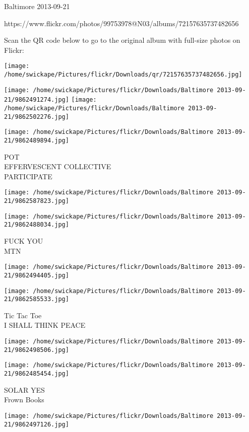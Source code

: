 \documentclass[10pt,letterpaper]{article}
\begin{document}
Baltimore 2013-09-21

https://www.flickr.com/photos/99753978@N03/albums/72157635737482656

Scan the QR code below to go to the original album with full-size photos on Flickr:

\texttt{[image: /home/swickape/Pictures/flickr/Downloads/qr/72157635737482656.jpg]}
\pagebreak

\texttt{[image: /home/swickape/Pictures/flickr/Downloads/Baltimore 2013-09-21/9862491274.jpg]}
\texttt{[image: /home/swickape/Pictures/flickr/Downloads/Baltimore 2013-09-21/9862502276.jpg]}

\texttt{[image: /home/swickape/Pictures/flickr/Downloads/Baltimore 2013-09-21/9862489894.jpg]}

POT\\
EFFERVESCENT COLLECTIVE\\
PARTICIPATE
\pagebreak

\texttt{[image: /home/swickape/Pictures/flickr/Downloads/Baltimore 2013-09-21/9862587823.jpg]}

\vspace{0.25in}
\texttt{[image: /home/swickape/Pictures/flickr/Downloads/Baltimore 2013-09-21/9862488034.jpg]}

FUCK YOU\\
MTN
\pagebreak

\texttt{[image: /home/swickape/Pictures/flickr/Downloads/Baltimore 2013-09-21/9862494405.jpg]}

\vspace{0.25in}
\texttt{[image: /home/swickape/Pictures/flickr/Downloads/Baltimore 2013-09-21/9862585533.jpg]}

Tic Tac Toe\\
I SHALL THINK PEACE
\pagebreak

\texttt{[image: /home/swickape/Pictures/flickr/Downloads/Baltimore 2013-09-21/9862498506.jpg]}

\vspace{0.25in}
\texttt{[image: /home/swickape/Pictures/flickr/Downloads/Baltimore 2013-09-21/9862485454.jpg]}

SOLAR YES\\
Frown Books
\pagebreak

\texttt{[image: /home/swickape/Pictures/flickr/Downloads/Baltimore 2013-09-21/9862497126.jpg]}
\end{document}
